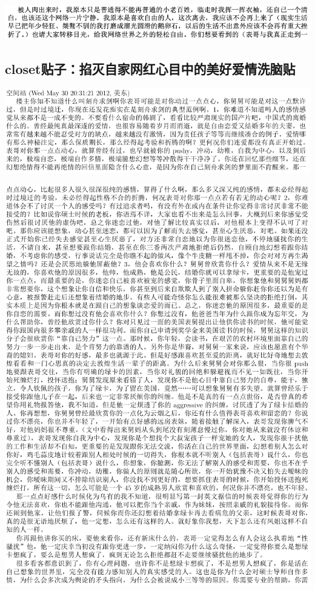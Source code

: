 \documentclass[9pt, b5paper]{article}
\begin{document}
\begin{center}
\includegraphics[width=.9\linewidth]{./pic/p1p165.png}
\end{center}

\subsection{closet贴子：掐灭自家网红心目中的美好爱情洗脑贴}
\label{sec:orgbbe970f}

\begin{center}
\includegraphics[width=.9\linewidth]{./pic/p1p108.png}
\end{center}
\begin{center}
\includegraphics[width=.9\linewidth]{./pic/p1p109.png}
\end{center}
\end{document}
